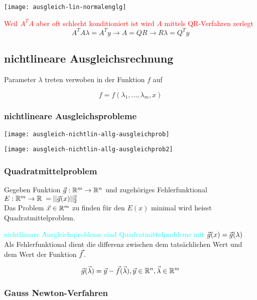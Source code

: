 \texttt{[image: ausgleich-lin-normalenglg]}

\textcolor{red}{Weil $A^T A$ aber oft schlecht konditioniert ist wird $A$ mittels
	QR-Verfahren zerlegt
}
{\Large
	$$A^T A \lambda = A^T y \rightarrow A = QR \rightarrow R \lambda = Q^T y$$
}





\subsection{nichtlineare Ausgleichsrechnung}

Parameter $\lambda$ treten verwoben in der Funktion $f$ auf

$$f = f(\lambda_1, ..., \lambda_m, x)$$

\subsubsection{nichtlineare Ausgleichsprobleme}

\texttt{[image: ausgleich-nichtlin-allg-ausgleichprob]}

\texttt{[image: ausgleich-nichtlin-allg-ausgleichprob2]}



\subsubsection{Quadratmittelproblem}

Gegeben Funktion $\vec g: \mathbb{R}^m \to \mathbb{R}^n$ und zugehöriges Fehlerfunktional
$E: \mathbb{R}^m \to \mathbb{R} \; = || \vec g(x) ||_2^2$ \\
Das Problem $\vec x \in \mathbb{R}^m$ zu finden für den $E(x)$ minimal wird heisst
Quadratmittelproblem.

\textcolor{cyan}{nichtlineare Ausgleichsprobleme sind Quadratmittelprobleme
	mit $\vec g(x) = \vec g(\lambda)$.}
Als Fehlerfunktional dient die differenz zwischen dem tatsächlichen Wert und dem
Wert der Funktion $\vec f$.

	{\large
		$$\vec g(\vec \lambda) = \vec y - \vec f(\vec \lambda), \vec y \in \mathbb{R}^n, \vec \lambda \in \mathbb{R}^m$$
	}



\subsubsection{Gauss Newton-Verfahren}


